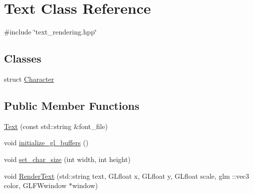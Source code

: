 \hypertarget{classText}{}\section{Text Class Reference}
\label{classText}


{\ttfamily \#include \char`\"{}text\+\_\+rendering.\+hpp\char`\"{}}

\subsection*{Classes}
\begin{DoxyCompactItemize}
\item 
struct \mbox{\hyperlink{structText_1_1Character}{Character}}
\end{DoxyCompactItemize}
\subsection*{Public Member Functions}
\begin{DoxyCompactItemize}
\item 
\mbox{\hyperlink{classText_ac76e1d24db004590f1e03da44dfb04dd}{Text}} (const std\+::string \&font\+\_\+file)
\item 
void \mbox{\hyperlink{classText_a8e38585b2e2f824a97895f3ca743372c}{initialize\+\_\+gl\+\_\+buffers}} ()
\item 
void \mbox{\hyperlink{classText_abc6c6300e6d689d25e25ff47575aa81b}{set\+\_\+char\+\_\+size}} (int width, int height)
\item 
void \mbox{\hyperlink{classText_ae5fe3bc91282c8a70253af9baf904b22}{Render\+Text}} (std\+::string text, G\+Lfloat x, G\+Lfloat y, G\+Lfloat scale, glm \+::vec3 color, G\+L\+F\+Wwindow $\ast$window)
\end{DoxyCompactItemize}
